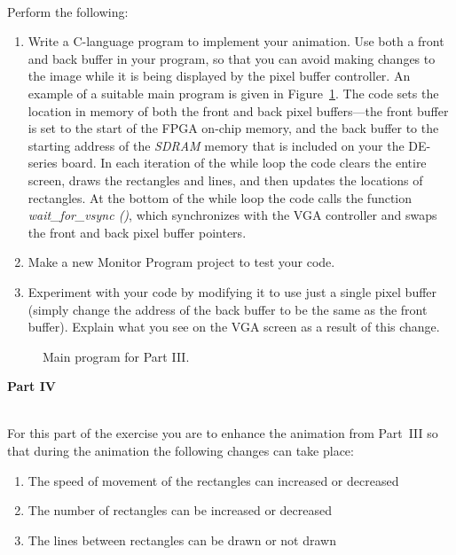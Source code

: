 \documentclass[epsfig,10pt,fullpage]{article}
\begin{document}
~\\
\noindent
Perform the following:

\begin{enumerate}

\item Write a C-language program to implement your animation. Use both a front and back buffer 
in your program, so that you can avoid making changes to the image while it is being displayed 
by the pixel buffer controller.  An example of a suitable main program is given in 
Figure~\ref{fig:main3}. The code sets the location in memory of both the front and back pixel 
buffers---the front buffer is set to the start of the FPGA on-chip memory, and the back
buffer to the starting address of the {\it SDRAM} memory that is included on your the DE-series
board. In each iteration of the while loop the code clears the entire screen, 
draws the rectangles and lines, and then 
updates the locations of rectangles. At the bottom of the while loop the code calls the
function {\it wait\_for\_vsync ()}, which synchronizes with the VGA controller and swaps the 
front and back pixel buffer pointers.

\item Make a new Monitor Program project to test your code.

\item Experiment with your code by modifying it to use just a single pixel buffer (simply
change the address of the back buffer to be the same as the front buffer). Explain what you 
see on the VGA screen as a result of this change.
\end{enumerate}

\begin{figure}[H]
\centering

\caption{Main program for Part III.}
\label{fig:main3}
\end{figure}

\newpage
\noindent
{\bf Part IV}

\noindent
~\\
For this part of the exercise you are to enhance the animation from Part~III so that
during the animation the following changes can take place:

\begin{enumerate}
\item
The speed of movement of the rectangles can increased or decreased
\item
The number of rectangles can be increased or decreased
\item
The lines between rectangles can be drawn or not drawn
\end{enumerate}
\end{document}
